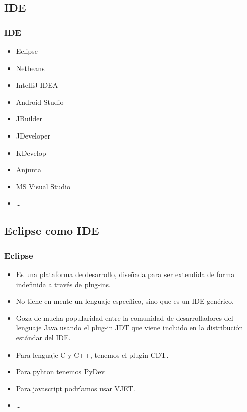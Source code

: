 \documentclass{beamer}
\begin{document}
\subsection{IDE}
\begin{frame}
\frametitle{IDE}
\begin{Large}
\begin{itemize}[<+->]
\item Eclipse
\item Netbeans
\item IntelliJ IDEA
\item Android Studio
\item JBuilder
\item JDeveloper
\item KDevelop
\item Anjunta
\item MS Visual Studio
\item \dots
\end{itemize}
\end{Large}
\end{frame}

\subsection{Eclipse como IDE}
\begin{frame}
\frametitle{Eclipse}
\begin{itemize}[<+->]
\item Es una plataforma de desarrollo, diseñada para ser extendida de forma indefinida a través de plug-ins.
\item No tiene en mente un lenguaje específico, sino que es un IDE genérico.
\item Goza de mucha popularidad entre la comunidad de desarrolladores del lenguaje Java usando el plug-in JDT que viene incluido en la distribución estándar del IDE.
\item Para lenguaje C y C++, tenemos el plugin CDT.
\item Para pyhton tenemos PyDev
\item Para javascript podríamos usar VJET.
\item \dots
\end{itemize}
\end{frame}
\end{document}
